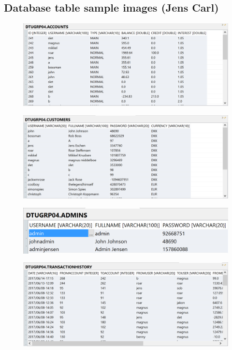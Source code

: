 \subsection{Database table sample images (Jens Carl)}\label{sec:apendixTables}
\begin{figure}[H]
    \centering
    \includegraphics[width=\textwidth]{figures/accountsTable.PNG}
    \label{fig:accountsTable}
\end{figure}
\begin{figure}[H]
    \centering
    \includegraphics[width=\textwidth]{figures/customerTable.PNG}
    \label{fig:customersTable}
\end{figure}
\begin{figure}[H]
    \centering
    \includegraphics[width=\textwidth]{figures/adminsTable.PNG}
    \label{fig:adminsTable}
\end{figure}
\begin{figure}[H]
    \centering
    \includegraphics[width=\textwidth]{figures/transactionhistoryTable.PNG}
    \label{fig:transactionhistoryTable}
\end{figure}
